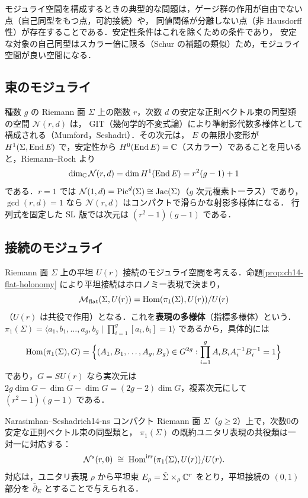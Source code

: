 モジュライ空間を構成するときの典型的な問題は，ゲージ群の作用が自由でない点（自己同型をもつ点，可約接続）や，
同値関係が分離しない点（非 Hausdorff 性）が存在することである．安定性条件はこれを除くための条件であり，
安定な対象の自己同型はスカラー倍に限る（Schur の補題の類似）ため，モジュライ空間が良い空間になる．

\subsection{束のモジュライ}

種数 $g$ の Riemann 面 $\Sigma$ 上の階数 $r$，次数 $d$ の安定な正則ベクトル束の同型類の空間 $\mathcal{N}(r,d)$ は，
GIT（幾何学的不変式論）により準射影代数多様体として構成される（Mumford，Seshadri）．その次元は，
$E$ の無限小変形が $H^1(\Sigma,\operatorname{End} E)$ で，安定性から $H^0(\operatorname{End} E)=\mathbb{C}$（スカラー）であることを用いると，Riemann--Roch より
\begin{equation}
  \dim_{\mathbb{C}}\mathcal{N}(r,d) = \dim H^1(\operatorname{End} E) = r^2(g-1)+1
\end{equation}
である．$r=1$ では $\mathcal{N}(1,d)=\operatorname{Pic}^d(\Sigma)\cong\mathrm{Jac}(\Sigma)$（$g$ 次元複素トーラス）であり，
$\gcd(r,d)=1$ なら $\mathcal{N}(r,d)$ はコンパクトで滑らかな射影多様体になる．
行列式を固定した $\operatorname{SL}$ 版では次元は $(r^2-1)(g-1)$ である．

\subsection{接続のモジュライ}

Riemann 面 $\Sigma$ 上の平坦 $U(r)$ 接続のモジュライ空間を考える．命題\ref{prop:ch14-flat-holonomy} により平坦接続はホロノミー表現で決まり，
\begin{equation}
  \mathcal{M}_{\rm flat}(\Sigma,U(r)) = \operatorname{Hom}(\pi_1(\Sigma),U(r))/U(r)
\end{equation}
（$U(r)$ は共役で作用）となる．これを\textbf{表現の多様体}（指標多様体）という．
$\pi_1(\Sigma) = \langle a_1,b_1,\dots,a_g,b_g\mid\prod_{i=1}^g[a_i,b_i]=1\rangle$ であるから，具体的には
\begin{equation}
  \operatorname{Hom}(\pi_1(\Sigma),G) = \Bigl\{(A_1,B_1,\dots,A_g,B_g)\in G^{2g}:\prod_{i=1}^g A_iB_iA_i^{-1}B_i^{-1}=1\Bigr\}
\end{equation}
であり，$G=SU(r)$ なら実次元は $2g\dim G - \dim G - \dim G = (2g-2)\dim G$，複素次元にして $(r^2-1)(g-1)$ である．

\begin{mythm}{Narasimhan--Seshadri}{ch14-ns}
コンパクト Riemann 面 $\Sigma$（$g\geq 2$）上で，次数0の安定な正則ベクトル束の同型類と，
$\pi_1(\Sigma)$ の既約ユニタリ表現の共役類は一対一に対応する：
\begin{equation}
  \mathcal{N}^{s}(r,0) \;\cong\; \operatorname{Hom}^{\rm irr}(\pi_1(\Sigma),U(r))/U(r).
\end{equation}
対応は，ユニタリ表現 $\rho$ から平坦束 $E_\rho=\tilde\Sigma\times_\rho\mathbb{C}^r$ をとり，平坦接続の $(0,1)$ 部分を $\bar\partial_E$ とすることで与えられる．
\end{mythm}

